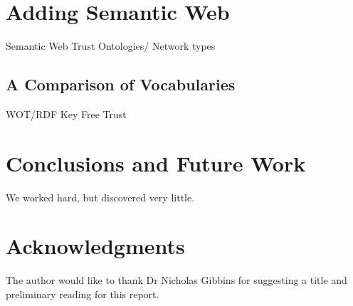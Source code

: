 \documentclass{acm_proc_article-sp}
\begin{document}
\section{Adding Semantic Web}
Semantic Web Trust Ontologies/ Network types
\subsection{A Comparison of Vocabularies}
WOT/RDF
Key Free Trust

\section{Conclusions and Future Work}
We worked hard, but discovered very little.

\section{Acknowledgments}
The author would like to thank Dr Nicholas Gibbins for suggesting a title and preliminary reading for this report.

%

%
%
\end{document}
